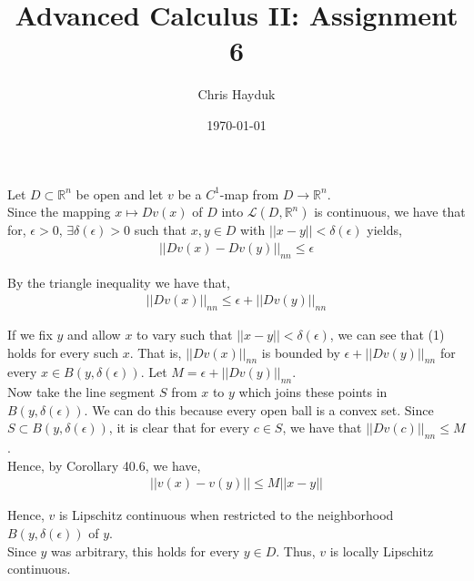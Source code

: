 \documentclass[12pt]{article}
\newenvironment{problem}[2][Problem]{\begin{trivlist}
\item[\hskip \labelsep {\bfseries #1}\hskip \labelsep {\bfseries #2.}]}{\end{trivlist}}
\begin{document}
\title{Advanced Calculus II: Assignment 6}

\author{Chris Hayduk}
\date{\today}

\maketitle

\begin{problem}{1}
\end{problem}

Let $D \subset \mathbb{R}^n$ be open and let $v$ be a $C^1$-map from $D \to \mathbb{R}^n$.\\

Since the mapping $x \mapsto Dv(x)$ of $D$ into $\mathcal{L}(D, \mathbb{R}^n)$ is continuous, we have that for, $\epsilon > 0$, $\exists \delta(\epsilon) > 0$ such that $x, y \in D$ with $||x - y|| < \delta(\epsilon)$ yields,
\begin{align*}
||Dv(x) - Dv(y)||_{nn} \leq \epsilon
\end{align*}

By the triangle inequality we have that,
\begin{align}
||Dv(x)||_{nn} \leq \epsilon + ||Dv(y)||_{nn}
\end{align}

If we fix $y$ and allow $x$ to vary such that $||x - y|| < \delta(\epsilon)$, we can see that (1) holds for every such $x$. That is, $||Dv(x)||_{nn}$ is bounded by $\epsilon + ||Dv(y)||_{nn}$ for every $x \in B(y, \delta(\epsilon))$. Let $M = \epsilon + ||Dv(y)||_{nn}$.\\

Now take the line segment $S$ from $x$ to $y$ which joins these points in $B(y, \delta(\epsilon))$. We can do this because every open ball is a convex set. Since $S \subset B(y, \delta(\epsilon))$, it is clear that for every $c \in S$, we have that $||Dv(c)||_{nn} \leq M$.\\

Hence, by Corollary 40.6, we have,
\begin{align*}
||v(x) - v(y)|| \leq M||x - y||
\end{align*}

Hence, $v$ is Lipschitz continuous when restricted to the neighborhood $B(y, \delta(\epsilon))$ of $y$.\\

Since $y$ was arbitrary, this holds for every $y \in D$. Thus, $v$ is locally Lipschitz continuous.
\end{document}
